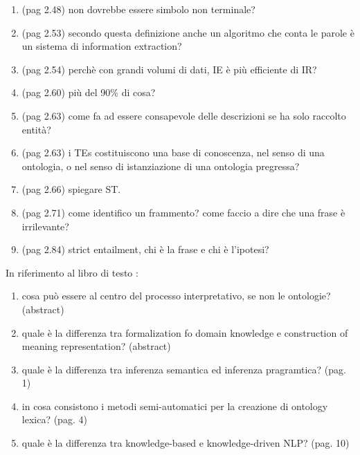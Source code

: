 \begin{enumerate}
	\item (pag 2.48) non dovrebbe essere simbolo non terminale?
	
	\item (pag 2.53) secondo questa definizione anche un algoritmo che conta le parole è un sistema di information extraction?
	
	\item (pag 2.54) perchè con grandi volumi di dati, IE è più efficiente di IR?
	
	\item (pag 2.60) più del 90\% di cosa?
	
	\item (pag 2.63) come fa ad essere consapevole delle descrizioni se ha solo raccolto entità?
	
	\item (pag 2.63) i TEs costituiscono una base di conoscenza, nel senso di una ontologia, o nel senso di istanziazione di una ontologia pregressa?
	
	\item (pag 2.66) spiegare ST.
	
	\item (pag 2.71) come identifico un frammento? come faccio a dire che una frase è irrilevante?
	
	\item (pag 2.84) strict entailment, chi è la frase e chi è l'ipotesi?	
	
\end{enumerate}

In riferimento al libro di testo \cite{cimiano2014ontology}:

\begin{enumerate}

	\item cosa può essere al centro del processo interpretativo, se non le ontologie? (abstract)
	
	\item quale è la differenza tra formalization fo domain knowledge e construction of meaning representation? (abstract)	
	
	\item quale è la differenza tra inferenza semantica ed inferenza pragramtica? (pag. 1)
	
	\item in cosa consistono i metodi semi-automatici per la creazione di ontology lexica? (pag. 4)
	
	\item quale è la differenza tra knowledge-based e knowledge-driven NLP? (pag. 10)	

\end{enumerate}
				